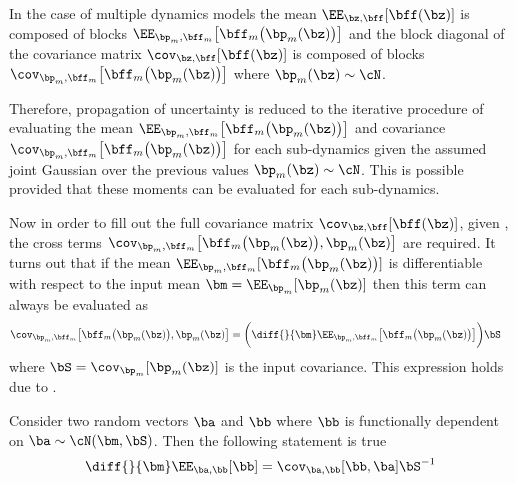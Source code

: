 \begin{ass} \label{ass:multigauss}
In the case of multiple dynamics models the mean $\EE_{\bz,\bff}[\bff(\bz)]$ is composed of blocks $\EE_{\bp_m,\bff_m}\big[\bff_m\big(\bp_m(\bz)\big)\big]$ and the block diagonal of the covariance matrix $\cov_{\bz,\bff}[\bff(\bz)]$ is composed of blocks $\cov_{\bp_m,\bff_m}\big[\bff_m\big(\bp_m(\bz)\big)\big]$ where $\bp_m(\bz) \sim \cN$.
\end{ass}

Therefore, propagation of uncertainty is reduced to the iterative procedure of evaluating the mean $\EE_{\bp_m,\bff_m}\big[\bff_m\big(\bp_m(\bz)\big)\big]$ and covariance $\cov_{\bp_m,\bff_m}\big[\bff_m\big(\bp_m(\bz)\big)\big]$ for each sub-dynamics given the assumed joint Gaussian over the previous values $\bp_m(\bz) \sim \cN$. This is possible provided that these moments can be evaluated for each sub-dynamics.

Now in order to fill out the full covariance matrix $\cov_{\bz,\bff}[\bff(\bz)]$, given , the cross terms $\cov_{\bp_m,\bff_m}\big[\bff_m\big(\bp_m(\bz)\big), \bp_m(\bz)\big]$ are required. It turns out that if the mean $\EE_{\bp_m,\bff_m}[\bff_m\big(\bp_m(\bz)\big)]$ is differentiable with respect to the input mean $\bm = \EE_{\bp_m}[\bp_m(\bz)]$ then this term can always be evaluated as
%
\begin{align}
\cov_{\bp_m,\bff_m}\big[\bff_m\big(\bp_m(\bz)\big), \bp_m(\bz)\big] &= \bigg(\diff{}{ \bm } \EE_{\bp_m,\bff_m}\big[\bff_m\big(\bp_m(\bz)\big)\big] \bigg) \bS
\label{eqn:multicov}
\end{align}
%
where $\bS = \cov_{\bp_m}[\bp_m(\bz)]$ is the input covariance. This expression holds due to .


\begin{theo} \label{theo:inpout}
Consider two random vectors $\ba$ and $\bb$ where $\bb$ is functionally dependent on $\ba \sim \cN(\bm,\bS)$. Then the following statement is true
\begin{equation}
\diff{}{ \bm }\EE_{\ba,\bb}[\bb] =  \cov_{\ba,\bb}[\bb,\ba] \bS^{-1}
\end{equation}
\espa
\end{theo}



